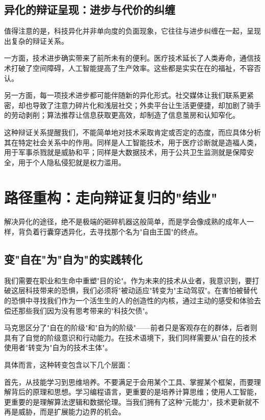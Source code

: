 \documentclass[a4paper,12pt]{ctexart}
\begin{document}
\subsection{异化的辩证呈现：进步与代价的纠缠}

值得注意的是，科技异化并非单向度的负面现象，它往往与进步纠缠在一起，呈现出复杂的辩证关系。

一方面，技术进步确实带来了前所未有的便利。医疗技术延长了人类寿命，通信技术打破了空间障碍，人工智能提高了生产效率。这些都是实实在在的福祉，不容否认。

另一方面，每一项技术进步都可能伴随新的异化形式。社交媒体让我们联系更紧密，却也导致了注意力碎片化和浅层社交；外卖平台让生活更便捷，却加剧了骑手的劳动剥削；算法推荐让信息获取更高效，却制造了信息茧房和认知窄化。

这种辩证关系提醒我们，不能简单地对技术采取肯定或否定的态度，而应具体分析其在特定社会关系中的作用。同样是人工智能技术，用于医疗诊断就是造福人类，用于军事杀戮就是威胁和平；同样是大数据技术，用于公共卫生监测就是保障安全，用于个人隐私侵犯就是权力滥用。

\section{路径重构：走向辩证复归的"结业"}

解决异化的途径，绝不是极端的砸碎机器这般简单，而是学会像成熟的成年人一样，背负着行囊穿透异化，去寻找那个名为"自由王国"的终点。

\subsection{变"自在"为"自为"的实践转化}

我们需要在职业和生命中重塑"目的论"。作为未来的技术从业者，我意识到，要打破这层科技带来的恐惧，我们必须将"被动适应"转变为"主动驾驭"。在害怕被替代的恐惧中寻找我们作为一个活生生的人的创造性的内核，通过主动的感受和体验去偿还那些我们因为没有思考带来的"科技欠债"。

马克思区分了"自在的阶级"和"自为的阶级"——前者只是客观存在的群体，后者则具有了自觉的阶级意识和行动能力。在技术语境下，我们同样需要从"自在的技术使用者"转变为"自为的技术主体"。

具体而言，这种转变包含以下几个层面：

首先，从技能学习到思维培养。不要满足于会用某个工具、掌握某个框架，而要理解背后的原理和思想。学习编程语言，更重要的是培养计算思维；使用人工智能，更重要的是理解算法逻辑和数据伦理。当我们拥有了这种"元能力"，技术更新就不再是威胁，而是扩展能力边界的机会。
\end{document}
